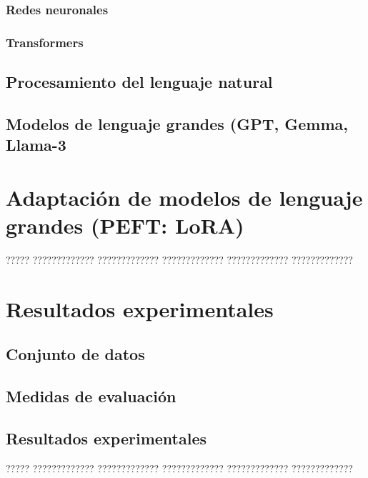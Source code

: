 \documentclass[11pt,spanish,listoffigures,listoftables]{tfgetsinf}
\begin{document}
\subsection{Redes neuronales}

\subsection{Transformers}

\section{Procesamiento del lenguaje natural}

\section{Modelos de lenguaje grandes (GPT, Gemma, Llama-3}









\chapter{Adaptación de modelos de lenguaje grandes (PEFT: LoRA)}

????? ????????????? ????????????? ????????????? ????????????? ????????????? 

\chapter{Resultados experimentales}

\section{Conjunto de datos}

\section{Medidas de evaluación}

\section{Resultados experimentales}

????? ????????????? ????????????? ????????????? ????????????? ?????????????

\end{document}
